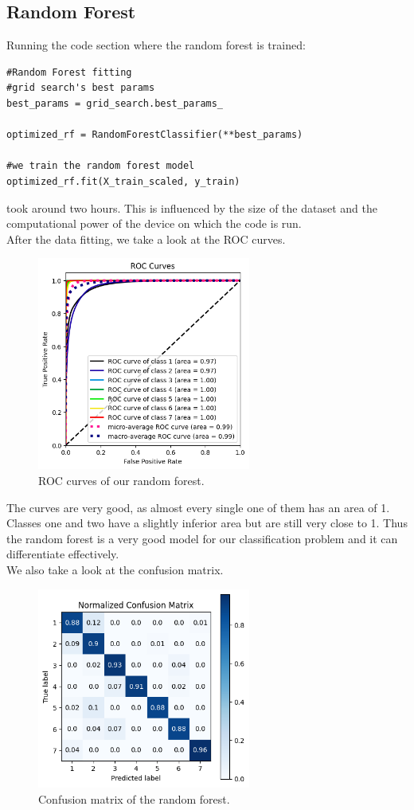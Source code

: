 \documentclass[letterpaper,12pt]{article}
\begin{document}
\subsection{Random Forest}
Running the code section where the random forest is trained:
\begin{lstlisting}
#Random Forest fitting
#grid search's best params
best_params = grid_search.best_params_

optimized_rf = RandomForestClassifier(**best_params)

#we train the random forest model
optimized_rf.fit(X_train_scaled, y_train)
\end{lstlisting}
took around two hours. This is influenced by the size of the dataset and the computational power of the device on which the code is run.\\
After the data fitting, we take a look at the ROC curves.
\begin{figure}[H]
    \centering
    \includegraphics[width=7cm]{ROCRF.png}
    \caption{\centering ROC curves of our random forest.}
    \label{cross}
\end{figure}
The curves are very good, as almost every single one of them has an area of 1. Classes one and two have a slightly inferior area but are still very close to 1. Thus the random forest is a very good model for our classification problem and it can differentiate effectively.\\
We also take a look at the confusion matrix.
\begin{figure}[H]
    \centering
    \includegraphics[width=7cm]{CMatrRF.png}
    \caption{\centering Confusion matrix of the random forest.}
    \label{cross}
\end{figure}
\end{document}
